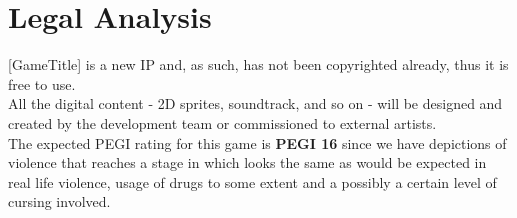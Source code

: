 \section{Legal Analysis}

[GameTitle] is a new IP and, as such, has not been copyrighted already, thus it is free to use. \\

All the digital content - 2D sprites, soundtrack, and so on - will be designed and created by the development team or commissioned to external artists. \\

The expected PEGI rating for this game is \textbf{PEGI 16} since we have depictions of violence that reaches a stage in which looks the same as would be expected in real life violence, usage of drugs to some extent and a possibly a certain level of cursing involved. \\

\pagebreak 